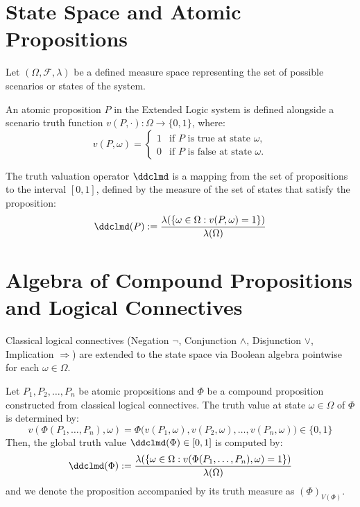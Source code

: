\section{State Space and Atomic Propositions}
Let $(\Omega, \mathcal{F}, \lambda)$ be a defined measure space representing the set of possible scenarios or states of the system.

\begin{definition}
	An atomic proposition $P$ in the Extended Logic system is defined alongside a scenario truth function $v(P, \cdot) : \Omega \to \{0, 1\}$, where:
	\[
	v(P, \omega) = \begin{cases} 
		1 & \text{if } P \text{ is true at state } \omega, \\
		0 & \text{if } P \text{ is false at state } \omega.
	\end{cases}
	\]
\end{definition}

\begin{definition}
	The truth valuation operator $\ddclmd$ is a mapping from the set of propositions to the interval $[0, 1]$, defined by the measure of the set of states that satisfy the proposition:
	\[
	\ddclmd(P) := \frac{\lambda(\{\omega \in \Omega : v(P, \omega) = 1\})}{\lambda(\Omega)}
	\]
\end{definition}

\section{Algebra of Compound Propositions and Logical Connectives}
Classical logical connectives (Negation $\neg$, Conjunction $\land$, Disjunction $\lor$, Implication $\Rightarrow$) are extended to the state space via Boolean algebra pointwise for each $\omega \in \Omega$.

\begin{definition}
	Let $P_1, P_2, \dots, P_n$ be atomic propositions and $\Phi$ be a compound proposition constructed from classical logical connectives. The truth value at state $\omega \in \Omega$ of $\Phi$ is determined by:
	\[
	v(\Phi(P_1, \dots, P_n), \omega) = \Phi\big(v(P_1, \omega), v(P_2, \omega), \dots, v(P_n, \omega)\big) \in \{0, 1\}
	\]
	Then, the global truth value $\ddclmd(\Phi) \in [0, 1]$ is computed by:
	\[
	\ddclmd(\Phi) := \frac{\lambda(\{\omega \in \Omega : v(\Phi(P_1, \dots, P_n), \omega) = 1\})}{\lambda(\Omega)}
	\]
	and we denote the proposition accompanied by its truth measure as $(\Phi)_{V(\Phi)}$.
\end{definition}

